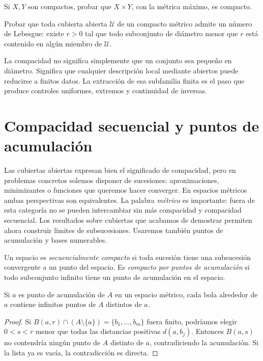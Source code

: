 \begin{ejercicio}\label{ej:lectura-13-7}
Si $X,Y$ son compactos, probar que $X\times Y$, con la métrica máximo, es compacto.
\end{ejercicio}


\begin{ejercicio}\label{ej:lectura-13-8}
Probar que toda cubierta abierta $\mathcal U$ de un compacto métrico admite un número de Lebesgue: existe $r>0$ tal que todo subconjunto de diámetro menor que $r$ está contenido en algún miembro de $\mathcal U$.
\end{ejercicio}


La compacidad no significa simplemente que un conjunto sea pequeño en diámetro. Significa que cualquier descripción local mediante abiertos puede reducirse a finitos datos. La extracción de esa subfamilia finita es el paso que produce controles uniformes, extremos y continuidad de inversas.

\section{Compacidad secuencial y puntos de acumulación}\label{lectura:14}
Las cubiertas abiertas expresan bien el significado de compacidad, pero en problemas concretos solemos disponer de sucesiones: aproximaciones, minimizantes o funciones que queremos hacer converger. En espacios métricos ambas perspectivas son equivalentes. La palabra \emph{métrico} es importante: fuera de esta categoría no se pueden intercambiar sin más compacidad y compacidad secuencial. Los resultados sobre cubiertas que acabamos de demostrar permiten ahora construir límites de subsucesiones. Usaremos también puntos de acumulación y bases numerables.

\begin{definicion}
Un espacio es \emph{secuencialmente compacto} si toda sucesión tiene una subsucesión convergente a un punto del espacio. Es \emph{compacto por puntos de acumulación} si todo subconjunto infinito tiene un punto de acumulación en el espacio.
\end{definicion}

\begin{lema}\label{ch14:acumulacion}
Si $a$ es punto de acumulación de $A$ en un espacio métrico, cada bola alrededor de $a$ contiene infinitos puntos de $A$ distintos de $a$.
\end{lema}
\begin{proof}
Si $B(a,r)\cap(A\setminus\{a\})=\{b_1,\ldots,b_m\}$ fuera finito, podríamos elegir $0<s<r$ menor que todas las distancias positivas $d(a,b_j)$. Entonces $B(a,s)$ no contendría ningún punto de $A$ distinto de $a$, contradiciendo la acumulación. Si la lista ya es vacía, la contradicción es directa.
\end{proof}

